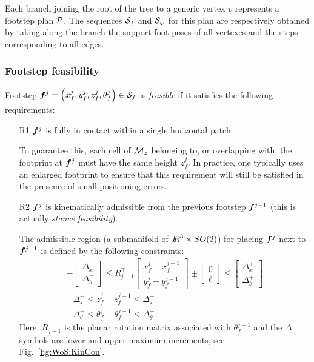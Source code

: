 Each branch joining the root of the tree to a generic vertex $v$ represents a
footstep plan $\cal P$. The sequences ${\cal S}_f$ and ${\cal S}_\varphi$ for
this plan are respectively obtained by taking along the branch the support foot
poses of all vertexes and the steps corresponding to all edges.

\medskip

\subsubsection{Footstep feasibility}
Footstep ${\bm{f}}^j=\left(x_f^j,y_f^j,z_f^j,\theta_f^j\right) \in {\cal S}_f$ is
\textit{feasible} if it satisfies the following requirements:   

\begin{itemize}

\smallskip
\item[R1] ${\bm{f}}^j$ is fully in contact within a single horizontal patch.

\smallskip
To guarantee this, each cell of ${\cal M}_{z}$ belonging to, or overlapping
with, the footprint at ${\bm{f}}^j$ must have the same height $z_{f}^j$.
In practice, one typically uses an enlarged footprint to ensure that this
requirement will still be satisfied in the presence of small positioning errors.

\smallskip
\item[R2] ${\bm{f}}^j$ is kinematically admissible from the previous footstep
${\bm{f}}^{j-1}$ (this is actually {\em stance feasibility}).

\smallskip
The admissible region (a submanifold of ${I\!\!R}^3 \times SO(2)$) for placing
${\bm{f}}^{j}$ next to ${\bm{f}}^{j-1}$ is defined by the following constraints:
\begin{gather} 
-\begin{bmatrix}
\Delta_x^- \\[5pt] \Delta_y^-
\end{bmatrix}
\le
R_{j-1}^\top \begin{bmatrix}
x_f^j - x_f^{j-1} \\[5pt] y_f^j - y_f^{j-1}
\end{bmatrix}
\pm \begin{bmatrix}
0 \\ \ell
\end{bmatrix}
\le
\begin{bmatrix}
\Delta_x^+ \\[5pt] \Delta_y^+
\end{bmatrix} \label{eq:WoS:XYAdmissible}\\[5pt]
-\Delta_z^- \le z_f^j - z_f^{j-1} \le \Delta_z^+
\label{eq:WoS:ZAdmissible}\\[5pt]
-\Delta_\theta^- \le \theta_f^j - \theta_f^{j-1} \le \Delta_\theta^+. \label{eq:WoS:ThetaAdmissible}
\end{gather}
Here, $R_{j-1}$ is the planar rotation matrix associated with $\theta_f^{j-1}$
and the $\Delta$ symbols are lower and upper maximum increments, see
Fig.~\ref{fig:WoS:KinCon}.


\end{itemize}
